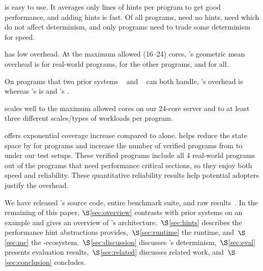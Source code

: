 \begin{tightenum}

\item \xxx is easy to use. It averages only \hintsperprog lines of hints
  per program to get good performance, and adding hints is fast.  Of all
  \nprog programs, \nprognohints need no hints, \nproglineuphints need
  \computes which do not affect determinism, and only \nprognondethints
  programs need \nondets to trade some determinism for speed.

\item \xxx has low overhead.  At the maximum allowed (16--24) cores, \xxx's
  geometric mean overhead is \meanrealoverhead for \nrealprog real-world programs,
  \meanbenchoverhead for the other \nbenchmarks programs, and \meanoverhead for all.

\item On \nprogcompared programs that two prior systems \dthreads~\cite{dthreads:sosp11}
  and \coredet~\cite{coredet:asplos10} can both handle, \xxx's overhead is \xxxcompoverhead whereas \dthreads's
  is \dthreadssyncoverhead and \coredet's \coredetoverhead.

\item \xxx scales well to the maximum allowed cores on our 24-core server and
  to at least three different scales/types of workloads per program.

\item \ecosys offers exponential coverage increase compared to \dbug alone.
  \xxx helps \dbug reduce the state space by \shrinkscale for
  \nprogshrink programs and increase the number of verified programs from
  \nprogverifieddbug to \nprogverifiedxxx under our test setups.
  These verified programs include all 4 real-world programs out of
  the \nprognondethints programs that need performance critical sections, so they
  enjoy both speed and reliability.
  These quantitative reliability results help potential \xxx adopters justify
  the overhead.

\end{tightenum}

We have released \xxx's source code, entire benchmark suite, and
raw results~\cite{Parrot:github}. In the remaining of this paper, $\S$\ref{sec:overview} contrasts \xxx with 
prior systems on an example and gives an overview of \xxx's 
architecture.~$\S$\ref{sec:hints} describes the performance hint abstractions \xxx
provides,~$\S$\ref{sec:runtime} the \xxx runtime, and~$\S$\ref{sec:mc} the
\xxx-\dbug ecosystem.~$\S$\ref{sec:discussion} discusses \xxx's determinism,~$\S$\ref{sec:eval}
presents evaluation results,~$\S$\ref{sec:related}
discusses related work, and~$\S$\ref{sec:conclusion} concludes.
